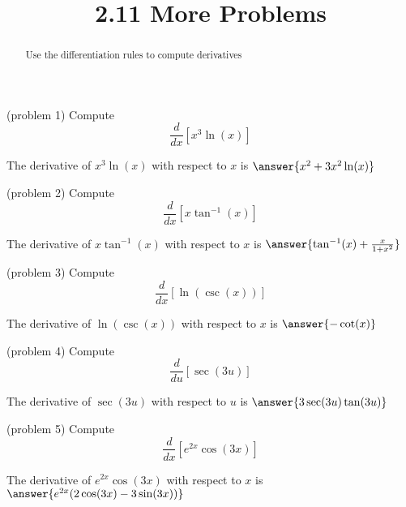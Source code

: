 \documentclass{ximera}
\title{2.11 More Problems}
\begin{document}
\begin{abstract}
Use the differentiation rules to compute derivatives
\end{abstract}

\maketitle








\begin{problem}(problem 1)
  Compute
  \[
  \frac{d}{dx}\left[x^3\ln(x)\right]
  \]
  
    
    
		The derivative of $x^3\ln (x)$ with respect to $x$ is
		 $\answer{x^2 + 3x^2\ln(x)}$
		
\end{problem}





\begin{problem}(problem 2)
  Compute
  \[
  \frac{d}{dx} \left[x \tan^{-1} (x)\right]
  \]
  
    
    
		The derivative of $x \tan^{-1} (x)$ with respect to $x$ is
		 $\answer{\tan^{-1}(x) + \frac{x}{1+x^2}}$
		
\end{problem}



\begin{problem}(problem 3)
  Compute
  \[
  \frac{d}{dx}\left[ \ln(\csc (x))\right]
  \]
  
    
    
		The derivative of $\ln(\csc (x))$ with respect to $x$ is
		 $\answer{-\cot(x)}$
		
\end{problem}



\begin{problem}(problem 4)
  Compute
  \[
  \frac{d}{du} \left[\sec(3u)\right]
  \]
  
    
    
		The derivative of $\sec(3u)$ with respect to $u$ is
		 $\answer{3\sec(3u)\tan(3u)}$
		
\end{problem}


\begin{problem}(problem 5)
  Compute
  \[
  \frac{d}{dx} \left[e^{2x} \cos(3x)\right]
  \]
  
   
    
		The derivative of $e^{2x} \cos(3x)$ with respect to $x$ is
		 $\answer{e^{2x}(2\cos(3x)-3\sin(3x))}$
		
\end{problem}
\end{document}
